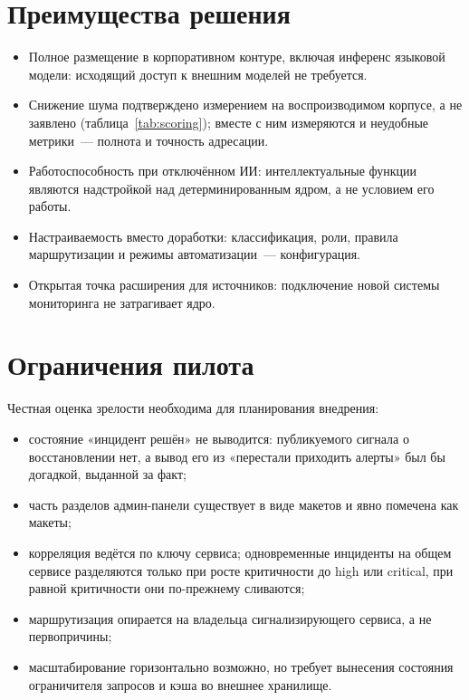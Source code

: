 \documentclass[utf8x, 12pt]{G7-32} %
\begin{document}
\section{Преимущества решения}
\begin{itemize}
    \item Полное размещение в корпоративном контуре, включая инференс языковой
          модели: исходящий доступ к внешним  моделей не требуется.
    \item Снижение шума подтверждено измерением на воспроизводимом корпусе, а
          не заявлено (таблица~\ref{tab:scoring}); вместе с ним измеряются и
          неудобные метрики~--- полнота и точность адресации.
    \item Работоспособность при отключённом ИИ: интеллектуальные функции
          являются надстройкой над детерминированным ядром, а не условием его
          работы.
    \item Настраиваемость вместо доработки: классификация, роли, правила
          маршрутизации и режимы автоматизации~--- конфигурация.
    \item Открытая точка расширения для источников: подключение новой системы
          мониторинга не затрагивает ядро.
\end{itemize}

\section{Ограничения пилота}
\label{sec:limits}
Честная оценка зрелости необходима для планирования внедрения:
\begin{itemize}
    \item состояние «инцидент решён» не выводится: публикуемого сигнала о
          восстановлении нет, а вывод его из «перестали приходить алерты» был бы
          догадкой, выданной за факт;
    \item часть разделов админ-панели существует в виде макетов и явно помечена
          как макеты;
    \item корреляция ведётся по ключу сервиса; одновременные инциденты на
          общем сервисе разделяются только при росте критичности до high или
          critical, при равной критичности они по-прежнему сливаются;
    \item маршрутизация опирается на владельца сигнализирующего сервиса, а не
          первопричины;
    \item масштабирование горизонтально возможно, но требует вынесения
          состояния ограничителя запросов и кэша во внешнее хранилище.
\end{itemize}
\end{document}
